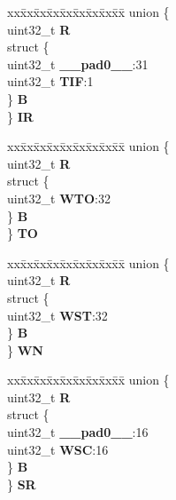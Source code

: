 \begin{DoxyCompactItemize}
\begin{tabbing}
\end{tabbing}\item 
\mbox{\label{structSWT__tag_a3fb10c33fa6ebd7d111a6c0480902392}} 
\begin{tabbing}
xx\=xx\=xx\=xx\=xx\=xx\=xx\=xx\=xx\=\kill
union \{\\
\>uint32\_t {\bfseries R}\\
\>struct \{\\
\>\>uint32\_t {\bfseries \_\_pad0\_\_}:31\\
\>\>uint32\_t {\bfseries TIF}:1\\
\>\} {\bfseries B}\\
\} {\bfseries IR}\\

\end{tabbing}\item 
\mbox{\label{structSWT__tag_a22177ac6c751192bb8ff2a3f63fff37e}} 
\begin{tabbing}
xx\=xx\=xx\=xx\=xx\=xx\=xx\=xx\=xx\=\kill
union \{\\
\>uint32\_t {\bfseries R}\\
\>struct \{\\
\>\>uint32\_t {\bfseries WTO}:32\\
\>\} {\bfseries B}\\
\} {\bfseries TO}\\

\end{tabbing}\item 
\mbox{\label{structSWT__tag_acc03b981d3d4fd7cd16226b55a8f4449}} 
\begin{tabbing}
xx\=xx\=xx\=xx\=xx\=xx\=xx\=xx\=xx\=\kill
union \{\\
\>uint32\_t {\bfseries R}\\
\>struct \{\\
\>\>uint32\_t {\bfseries WST}:32\\
\>\} {\bfseries B}\\
\} {\bfseries WN}\\

\end{tabbing}\item 
\mbox{\label{structSWT__tag_aa08641b3a4a4de9469b88b97bdb324a7}} 
\begin{tabbing}
xx\=xx\=xx\=xx\=xx\=xx\=xx\=xx\=xx\=\kill
union \{\\
\>uint32\_t {\bfseries R}\\
\>struct \{\\
\>\>uint32\_t {\bfseries \_\_pad0\_\_}:16\\
\>\>uint32\_t {\bfseries WSC}:16\\
\>\} {\bfseries B}\\
\} {\bfseries SR}\\


\end{tabbing}
\end{DoxyCompactItemize}
